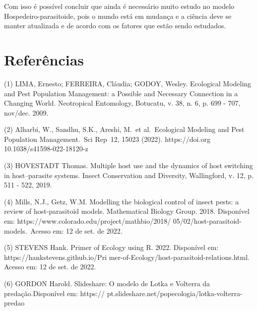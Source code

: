 Com isso é possível concluir que ainda é necessário muito estudo no modelo Hospedeiro-parasitoide, pois o mundo está em mudança e a ciência deve se manter atualizada e de acordo com os fatores que estão sendo estudados.


\section{Referências}

(1) LIMA, Ernesto; FERREIRA, Cláudia; GODOY, Wesley. Ecological Modeling and Pest Population Management: a Possible and 
Necessary Connection in a Changing World. Neotropical Entomology, Botucatu, v. 38, n. 6, p. 699 - 707, nov/dec. 2009.

\medskip

(2) Alharbi, W., Sandhu, S.K., Areshi, M. et al. Ecological Modeling and Pest Population Management. Sci Rep 12, 15023 (2022). https://doi.org 10.1038/s41598-022-18120-z

\medskip

(3) HOVESTADT Thomas. Multiple host use and the dynamics of host switching in host–parasite systems. Insect Conservation and Diversity, Wallingford, v. 12, p. 511 - 522, 2019.

\medskip

(4) Mills, N.J., Getz, W.M. Modelling the biological control of insect pests: a review of host-parasitoid models. Mathematical Biology Group. 2018. Disponível em: https://www.colorado.edu/project/mathbio/2018/
05/02/host-parasitoid-models. Acesso em: 12 de set. de 2022. 

\medskip

(5) STEVENS Hank. Primer of Ecology using R. 2022. Disponível em: https://hankstevens.github.io/Pri
mer-of-Ecology/host-parasitoid-relations.html. Acesso em: 12 de set. de 2022.

\medskip

(6) GORDON Harold. Slideshare: O modelo de Lotka e Volterra da predação.Disponível em: https:// pt.slideshare.net/popecologia/lotka-volterra-predao